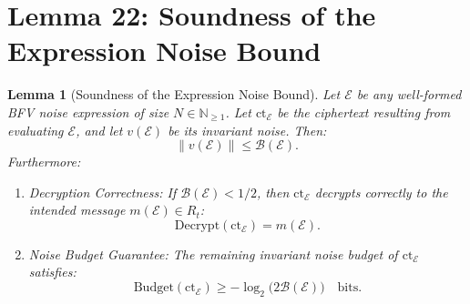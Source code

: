 \documentclass[11pt]{article}
\newtheorem{lemma}{Lemma}
\theoremstyle{definition}
\theoremstyle{remark}
\newcommand{\norm}[1]{\left\lVert #1\right\rVert}
\newcommand{\ct}{\mathrm{ct}}
\begin{document}
\section*{Lemma 22: Soundness of the Expression Noise Bound}

\begin{lemma}[Soundness of the Expression Noise Bound]\label{lem:general_bound}
Let $\mathcal{E}$ be any well-formed BFV noise expression of size $N \in \mathbb{N}_{\geq 1}$.
Let $\ct_{\mathcal{E}}$ be the ciphertext resulting from evaluating $\mathcal{E}$, and let $v(\mathcal{E})$ be its invariant noise.
Then:
\begin{equation}
  \norm{v(\mathcal{E})} \leq \mathcal{B}(\mathcal{E}).
  \label{eq:soundness}
\end{equation}
Furthermore:
\begin{enumerate}[leftmargin=2em,label=(\roman*)]
\item \emph{Decryption Correctness}: If $\mathcal{B}(\mathcal{E}) < 1/2$, then $\ct_{\mathcal{E}}$ decrypts correctly to the intended message $m(\mathcal{E}) \in R_t$:
\[
  \mathrm{Decrypt}(\ct_{\mathcal{E}}) = m(\mathcal{E}).
\]
\item \emph{Noise Budget Guarantee}: The remaining invariant noise budget of $\ct_{\mathcal{E}}$ satisfies:
\[
  \mathrm{Budget}(\ct_{\mathcal{E}}) \geq -\log_2\bigl(2\mathcal{B}(\mathcal{E})\bigr) \quad \text{bits}.
\]
\end{enumerate}
\end{lemma}
\end{document}
